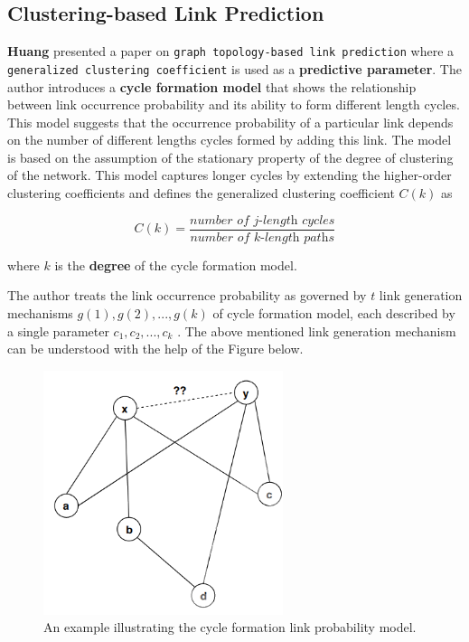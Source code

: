 \subsection{Clustering-based Link Prediction}

\textbf{Huang} presented a paper on
\texttt{graph\ topology-based\ link\ prediction} where a
\texttt{generalized\ clustering\ coefficient} is used as a
\textbf{predictive parameter}. The author introduces a \textbf{cycle
    formation model} that shows the relationship between link occurrence
probability and its ability to form different length cycles. This model
suggests that the occurrence probability of a particular link depends on
the number of different lengths cycles formed by adding this link. The
model is based on the assumption of the stationary property of the
degree of clustering of the network. This model captures longer cycles
by extending the higher-order clustering coefficients and defines the
generalized clustering coefficient \(C(k)\) as

\[C(k) = \frac{\textit{number of j-length cycles}}{\textit{number of k-length paths}}\]

where \(k\) is the \textbf{degree} of the cycle formation model.

The author treats the link occurrence probability as governed by \(t\)
link generation mechanisms \(g(1), g(2),...,g(k)\) of cycle formation
model, each described by a single parameter \(c_1, c_2,...,c_k\) . The
above mentioned link generation mechanism can be understood with the
help of the Figure below.

\begin{figure}[H]
    \centering
    \includegraphics[width=7cm, keepaspectratio]{capitoli/methods/imgs/img6.png}
    \caption{An example illustrating the cycle formation link probability model.}
\end{figure}

